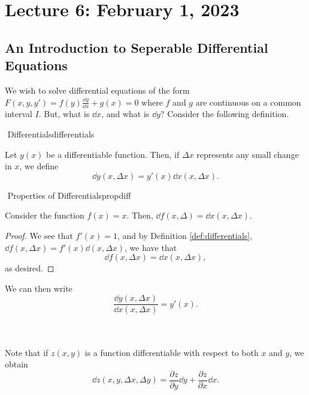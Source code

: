 
\section{Lecture 6: February 1, 2023}

\subsection{An Introduction to Seperable Differential Equations}

    We wish to solve differential equations of the form \(F(x,y,y')=f(y)\frac{\dd y}{\dd x}+g(x)=0\) where \(f\) and \(g\) are continuous on a common interval \(I\). But, what is \(\dd x\), and what is \(\dd y\)? Consider the following definition.
    \begin{definition}{\Stop\,\,Differentials}{differentials}

        Let \(y(x)\) be a differentiable function. Then, if \(\Delta x\) represents any small change in \(x\), we define
        \begin{equation*}
            \dd y(x,\Delta x)=y'(x)\dd x(x,\Delta x).
        \end{equation*}

    \end{definition}
    \begin{theorem}{\Stop\,\,Properties of Differentials}{propdiff}

        Consider the function \(f(x)=x\). Then, \(\dd f(x,\Delta)=\dd x(x,\Delta x)\).
        \begin{proof}
            We see that \(f'(x)=1\), and by Definition \ref{def:differentials}, \(\dd f(x,\Delta x)=f'(x)\dd(x,\Delta x)\), we have that
            \begin{equation*}
                \dd f(x,\Delta x)=\dd x(x,\Delta x),
            \end{equation*}
            as desired.
        \end{proof}
        We can then write
        \begin{equation*}
            \frac{\dd y(x,\Delta x)}{\dd x(x,\Delta x)}=y'(x).
        \end{equation*}
        
    \end{theorem}
    \vphantom
    \\
    \\
    Note that if \(z(x,y)\) is a function differentiable with respect to both \(x\) and \(y\), we obtain
    \begin{equation*}
        \dd z(x,y,\Delta x,\Delta y)=\frac{\partial z}{\partial y}\dd y+\frac{\partial z}{\partial x}\dd x.
    \end{equation*}
